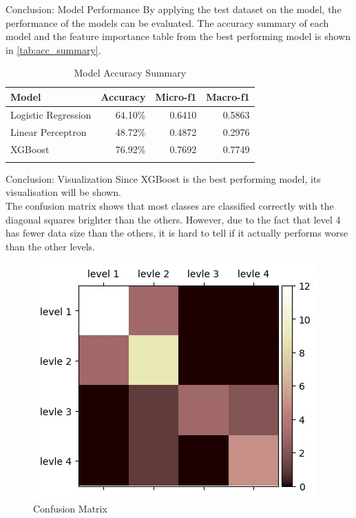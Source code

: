\begin{frame}{Conclusion: Model Performance}
By applying the test dataset on the model, the performance of the models can be evaluated. The accuracy summary of each 
model and the feature importance table from the best performing model is shown in \autoref{tab:acc_summary}.
\begin{table}
	\caption{Model Accuracy Summary}
	\centering
	\begin{tabular}{lrrr}
		\toprule
		\textbf{Model} & \textbf{Accuracy} & \textbf{Micro-f1} & \textbf{Macro-f1} \\
		\midrule
		Logistic Regression & 64.10\% & 0.6410 & 0.5863 \\
		Linear Perceptron & 48.72\% & 0.4872 & 0.2976 \\
		XGBoost & 76.92\% & 0.7692 &0.7749 \\
		\bottomrule
	\label{tab:acc_summary}
	\end{tabular}
\end{table}
\end{frame}
\begin{frame}{Conclusion: Visualization}
Since XGBoost is the best performing model, its visualisation will be shown. 
\\The confusion matrix shows that most classes are classified correctly with the diagonal squares brighter than the others. However, due to the fact that level 4 has fewer data size than the others, it is hard to tell if it actually performs worse than the other levels. 

\begin{figure}[H]
    \centering
    \includegraphics[width=0.4\linewidth]{presentation/images/illustrate/confma.jpeg}
    \caption{Confusion Matrix}
    \end{figure}

\end{frame}

